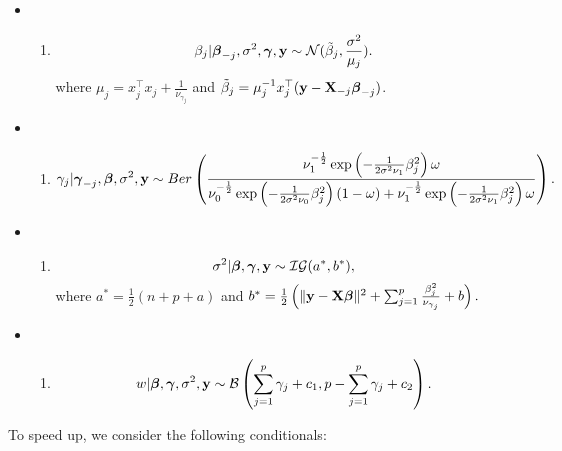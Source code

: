 \documentclass[]{book}
\providecommand{\tightlist}{%
  \setlength{\itemsep}{0pt}\setlength{\parskip}{0pt}}
\begin{document}
\begin{itemize}
\item
  \begin{enumerate}
  \def\labelenumi{\arabic{enumi})}
  \tightlist
  \item
    \[\beta_j|{\boldsymbol \beta}_{-j}, \sigma^2, {\boldsymbol \gamma}, {\bf y}\sim \mathcal{N}(\tilde{\beta}_j, \frac{\sigma^2}{\mu_j}).\]
    where \(\mu_j= x_j^{{\top}}x_j + \frac{1}{\nu_{\gamma_j}}\) and \(\tilde{\beta}_j = \mu_j^{-1}x_j^{{\top}}({\bf y}- {\bf X}_{-j}{\boldsymbol \beta}_{-j})\).
  \end{enumerate}
\item
  \begin{enumerate}
  \def\labelenumi{\arabic{enumi})}
  \setcounter{enumi}{1}
  \tightlist
  \item
    \[
    \gamma_j |{\boldsymbol \gamma}_{-j}, {\boldsymbol \beta}, \sigma^2, {\bf y}\sim Ber\left(\frac{ \nu_1^{-\frac{1}{2}}
    \exp\left(-\frac{1}{2\sigma^2\nu_1}\beta_j^2\right)\omega}
    {  \nu_0^{-\frac{1}{2}}\exp\left(-\frac{1}{2\sigma^2\nu_0}\beta_j^2\right)\left(1-\omega\right)+
     \nu_1^{-\frac{1}{2}}\exp\left(-\frac{1}{2\sigma^2\nu_1}\beta_j^2\right)\omega}\right).
    \]
  \end{enumerate}
\item
  \begin{enumerate}
  \def\labelenumi{\arabic{enumi})}
  \setcounter{enumi}{2}
  \tightlist
  \item
    \[\sigma^2|{\boldsymbol \beta}, {\boldsymbol \gamma}, {\bf y}\sim \mathcal{IG}(a^*,b^*),\]
    where \(a^*=\frac{1}{2}(n+p+a)\) and \(b^* = \frac{1}{2}\left(\|{\bf y}-{\bf X}{\boldsymbol \beta}\|^2 + \sum_{j=1}^{p}\frac{\beta_j^2}{\nu_{\gamma_j}} + b\right).\)
  \end{enumerate}
\item
  \begin{enumerate}
  \def\labelenumi{\arabic{enumi})}
  \setcounter{enumi}{3}
  \tightlist
  \item
    \[w|{\boldsymbol \beta},{\boldsymbol \gamma},\sigma^2,{\bf y}\sim \mathcal{B}\left(\sum_{j=1}^p \gamma_j+c_1,p-\sum_{j=1}^p \gamma_j+c_2\right).\]
  \end{enumerate}
\end{itemize}

To speed up, we consider the following conditionals:
\end{document}
